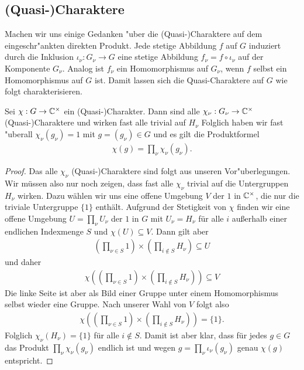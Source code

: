 \subsection{(Quasi-)Charaktere}
		Machen wir uns einige Gedanken "uber die (Quasi-)Charaktere auf dem eingeschr"ankten direkten Produkt.
		Jede stetige Abbildung $f$ auf $G$ induziert durch die Inklusion $\iota_\nu: G_\nu \to G$ eine stetige Abbildung  $f_\nu = f \circ \iota_\nu$ auf der Komponente $G_\nu$.
		Analog ist $f_\nu$ ein Homomorphismus auf $G_\nu$, wenn $f$ selbst ein Homomorphismus auf $G$ ist.
		Damit lassen sich die Quasi-Charaktere auf $G$ wie folgt charakterisieren.
		\begin{lemma}\label{lemma:rdp:char}
			Sei $\chi:G \to \mathbb{C}^\times$ ein (Quasi-)Charakter. 
			Dann sind alle $\chi_\nu: G_\nu \to \mathbb{C}^\times$ (Quasi-)Charaktere und wirken fast alle trivial auf $H_\nu$
			Folglich haben wir fast "uberall $\chi_\nu (g_\nu) = 1$ mit $g=(g_\nu)\in G$ und es gilt die Produktformel
			\begin{align*}
				\chi(g) = \prod_\nu \chi_\nu(g_\nu).
			\end{align*}
		\end{lemma}
		\begin{proof}
			Das alle $\chi_\nu$ (Quasi-)Charaktere sind folgt aus unseren Vor"uberlegungen.
			Wir müssen also nur noch zeigen, dass fast alle $\chi_\nu$ trivial auf die Untergruppen $H_\nu$ wirken. 
			Dazu wählen wir uns eine offene Umgebung $V$ der $1$ in $\mathbb{C}^\times$, die nur die triviale Untergruppe $\{1\}$ enthält. 
			Aufgrund der Stetigkeit von $\chi$ finden wir eine offene Umgebung $U=\prod_\nu U_\nu$ der $1$ in $G$ mit $U_\nu = H_\nu$ für alle $i$ außerhalb einer endlichen Indexmenge $S$ und $\chi(U)\subseteq V$.
			Dann gilt aber
			\begin{align*}
				(\prod_{\nu\in S} 1) \times (\prod_{i \notin S} H_\nu) \subseteq U 
			\end{align*}
			und daher
			\begin{align*}
				\chi((\prod_{\nu\in S} 1) \times (\prod_{i \notin S} H_\nu)) \subseteq V 
			\end{align*}
			Die linke Seite ist aber als Bild einer Gruppe unter einem Homomorphismus selbst wieder eine Gruppe. 
			Nach unserer Wahl von $V$ folgt also
			\begin{align*}
				\chi((\prod_{\nu\in S} 1) \times (\prod_{i \notin S} H_\nu)) = \{1\}.
			\end{align*}
			Folglich $\chi_\nu (H_\nu) = \{1\}$ für alle $i\notin S$. 
			Damit ist aber klar, dass für jedes $g \in G$ das Produkt $\prod_\nu \chi_\nu(g_\nu)$ endlich ist und wegen $g = \prod_{\nu} \iota_\nu(g_\nu)$ genau $\chi(g)$ entspricht.
			
		\end{proof}
